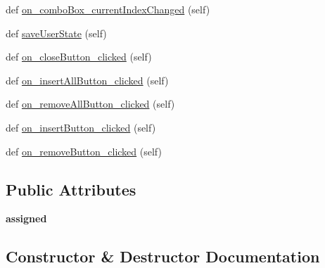 \begin{DoxyCompactItemize}
\item 
def \mbox{\hyperlink{class_dsg_tools_1_1_user_tools_1_1user__profiles_1_1_manage_user_profiles_a76c15098051c2641417b7e49ca93f1bb}{on\+\_\+combo\+Box\+\_\+current\+Index\+Changed}} (self)
\item 
def \mbox{\hyperlink{class_dsg_tools_1_1_user_tools_1_1user__profiles_1_1_manage_user_profiles_aab13f3c960fb53ba706eff647605712b}{save\+User\+State}} (self)
\item 
def \mbox{\hyperlink{class_dsg_tools_1_1_user_tools_1_1user__profiles_1_1_manage_user_profiles_a5098b2c130ed7bbc719c80ecf6f8e633}{on\+\_\+close\+Button\+\_\+clicked}} (self)
\item 
def \mbox{\hyperlink{class_dsg_tools_1_1_user_tools_1_1user__profiles_1_1_manage_user_profiles_a8aa13a0696007e61005d54b7babd9f80}{on\+\_\+insert\+All\+Button\+\_\+clicked}} (self)
\item 
def \mbox{\hyperlink{class_dsg_tools_1_1_user_tools_1_1user__profiles_1_1_manage_user_profiles_a185f560c9984dd8d81c1ace1625b1979}{on\+\_\+remove\+All\+Button\+\_\+clicked}} (self)
\item 
def \mbox{\hyperlink{class_dsg_tools_1_1_user_tools_1_1user__profiles_1_1_manage_user_profiles_a21c06c53c95cc88bc49c7bb4dc6bfcc3}{on\+\_\+insert\+Button\+\_\+clicked}} (self)
\item 
def \mbox{\hyperlink{class_dsg_tools_1_1_user_tools_1_1user__profiles_1_1_manage_user_profiles_abb1da9322b288055c8d5291856536123}{on\+\_\+remove\+Button\+\_\+clicked}} (self)
\end{DoxyCompactItemize}
\subsection*{Public Attributes}
\begin{DoxyCompactItemize}
\item 
\mbox{\label{class_dsg_tools_1_1_user_tools_1_1user__profiles_1_1_manage_user_profiles_ad83d59576a4946bf49728a2fd463644e}} 
{\bfseries assigned}
\end{DoxyCompactItemize}


\subsection{Constructor \& Destructor Documentation}
\mbox{\label{class_dsg_tools_1_1_user_tools_1_1user__profiles_1_1_manage_user_profiles_a1887fc986ce95413f9257b52fe64fbe0}} 
